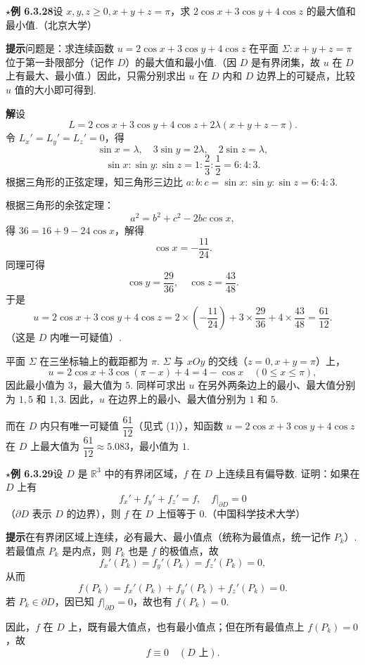 \documentclass[UTF8, 12pt, fontset=fandol, oneside]{ctexart}
\begin{document}
\noindent\textbf{\ensuremath{\star}例 6.3.28}\quad 设 $x,y,z\ge0,x+y+z=\pi$，求 $2\cos x+3\cos y+4\cos z$ 的最大值和最小值.（北京大学）

\noindent\textbf{提示}\quad 问题是：求连续函数 $u=2\cos x+3\cos y+4\cos z$ 在平面 $\Sigma:x+y+z=\pi$ 位于第一卦限部分（记作 $D$）的最大值和最小值.（因 $D$ 是有界闭集，故 $u$ 在 $D$ 上有最大、最小值.）因此，只需分别求出 $u$ 在 $D$ 内和 $D$ 边界上的可疑点，比较 $u$ 值的大小即可得到.

\noindent\textbf{解}\quad 设
\[
  L=2\cos x+3\cos y+4\cos z+2\lambda(x+y+z-\pi).
\]
令 $L_x'=L_y'=L_z'=0$，得
\[
  \sin x=\lambda,\quad 3\sin y=2\lambda,\quad 2\sin z=\lambda,
\]
\[
  \sin x:\sin y:\sin z=1:\frac23:\frac12=6:4:3.
\]
根据三角形的正弦定理，知三角形三边比 $a:b:c=\sin x:\sin y:\sin z=6:4:3$.

根据三角形的余弦定理：
\[
  a^2=b^2+c^2-2bc\cos x,
\]
得 $36=16+9-24\cos x$，解得
\[
  \cos x=-\frac{11}{24}.
\]
同理可得
\[
  \cos y=\frac{29}{36},\quad \cos z=\frac{43}{48}.
\]
于是
\[
  u=2\cos x+3\cos y+4\cos z
  =2\times\left(-\frac{11}{24}\right)
  +3\times\frac{29}{36}+4\times\frac{43}{48}
  =\frac{61}{12}. \tag{1}
\]
（这是 $D$ 内唯一可疑值）.

平面 $\Sigma$ 在三坐标轴上的截距都为 $\pi$. $\Sigma$ 与 $xOy$ 的交线（$z=0,x+y=\pi$）上，
\[
  u=2\cos x+3\cos(\pi-x)+4=4-\cos x\quad(0\le x\le\pi),
\]
因此最小值为 $3$，最大值为 $5$. 同样可求出 $u$ 在另外两条边上的最小、最大值分别为 $1,5$ 和 $1,3$. 因此，$u$ 在边界上的最小、最大值分别为 $1$ 和 $5$.

而在 $D$ 内只有唯一可疑值 $\dfrac{61}{12}$（见式 (1)），知函数 $u=2\cos x+3\cos y+4\cos z$ 在 $D$ 上最大值为 $\dfrac{61}{12}\approx5.083$，最小值为 $1$.

\noindent\textbf{\ensuremath{\star}例 6.3.29}\quad 设 $D$ 是 $\mathbb{R}^3$ 中的有界闭区域，$f$ 在 $D$ 上连续且有偏导数. 证明：如果在 $D$ 上有
\[
  f_x'+f_y'+f_z'=f,\quad f\big|_{\partial D}=0
\]
（$\partial D$ 表示 $D$ 的边界），则 $f$ 在 $D$ 上恒等于 $0$.（中国科学技术大学）

\noindent\textbf{提示}\quad 在有界闭区域上连续，必有最大、最小值点（统称为最值点，统一记作 $P_k$）. 若最值点 $P_k$ 是内点，则 $P_k$ 也是 $f$ 的极值点，故
\[
  f_x'(P_k)=f_y'(P_k)=f_z'(P_k)=0,
\]
从而
\[
  f(P_k)=f_x'(P_k)+f_y'(P_k)+f_z'(P_k)=0.
\]
若 $P_k\in\partial D$，因已知 $f|_{\partial D}=0$，故也有 $f(P_k)=0$.

因此，$f$ 在 $D$ 上，既有最大值点，也有最小值点；但在所有最值点上 $f(P_k)=0$，故
\[
  f\equiv0\quad(D\text{ 上}).
\]
\end{document}
